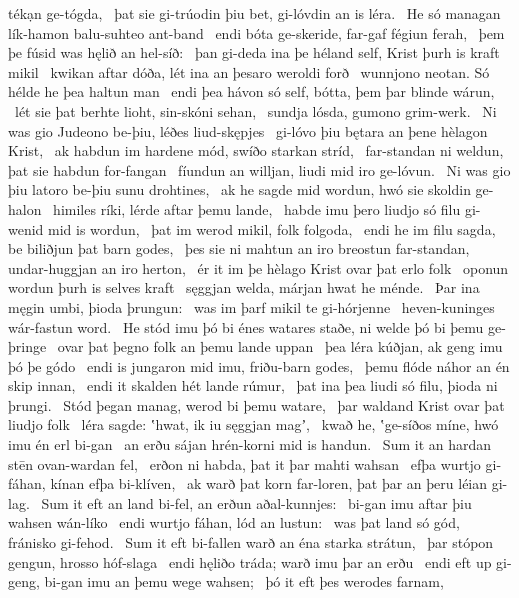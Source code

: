 tékạn ge-tógda, \hld\ þat sie gi-trúodin þiu bet,
gi-lóvdin an is léra. \hld\ He só managan lík-hamon
balu-suhteo ant-band \hld\ endi bóta ge-skeride,
far-gaf fégiun ferah, \hld\ þem þe fúsid was
hęlið an hel-síð: \hld\ þan gi-deda ina þe héland self,
Krist þurh is kraft mikil \hld\ kwikan aftar dóða,
lét ina an þesaro weroldi forð \hld\ wunnjono neotan.
Só hélde he þea haltun man \hld\ endi þea hávon só self,
bótta, þem þar blinde wárun, \hld\ lét sie þat berhte lioht,
sin-skóni sehan, \hld\ sundja lósda,
gumono grim-werk. \hld\ Ni was gio Judeono be-þiu,
léðes liud-skępjes \hld\ gi-lóvo þiu bętara
an þene hèlagon Krist, \hld\ ak habdun im hardene mód,
swíðo starkan stríd, \hld\ far-standan ni weldun,
þat sie habdun for-fangan \hld\ fíundun an willjan,
liudi mid iro ge-lóvun. \hld\ Ni was gio þiu latoro be-þiu
sunu drohtines, \hld\ ak he sagde mid wordun,
hwó sie skoldin ge-halon \hld\ himiles ríki,
lérde aftar þemu lande, \hld\ habde imu þero liudjo só filu
gi-wenid mid is wordun, \hld\ þat im werod mikil,
folk folgoda, \hld\ endi he im filu sagda,
be biliðjun þat barn godes, \hld\ þes sie ni mahtun an iro breostun far-standan,
undar-huggjan an iro herton, \hld\ ér it im þe hèlago Krist
ovar þat erlo folk \hld\ oponun wordun
þurh is selves kraft \hld\ sęggjan welda,
márjan hwat he ménde. \hld\ Þar ina męgin umbi,
þioda þrungun: \hld\ was im þarf mikil
te gi-hórjenne \hld\ heven-kuninges
wár-fastun word. \hld\ He stód imu þó bi énes watares staðe,
ni welde þó bi þemu ge-þringe \hld\ ovar þat þegno folk
an þemu lande uppan \hld\ þea léra kúðjan,
ak geng imu þó þe gódo \hld\ endi is jungaron mid imu,
friðu-barn godes, \hld\ þemu flóde náhor
an én skip innan, \hld\ endi it skalden hét
lande rúmur, \hld\ þat ina þea liudi só filu,
þioda ni þrungi. \hld\ Stód þegan manag,
werod bi þemu watare, \hld\ þar waldand Krist
ovar þat liudjo folk \hld\ léra sagde:
ʽhwat, ik iu sęggjan magʼ, \hld\ kwað he, ʽge-síðos míne,
hwó imu én erl bi-gan \hld\ an erðu sájan
hrén-korni mid is handun. \hld\ Sum it an hardan stēn
ovan-wardan fel, \hld\ erðon ni habda,
þat it þar mahti wahsan \hld\ efþa wurtjo gi-fáhan,
kínan efþa bi-klíven, \hld\ ak warð þat korn far-loren,
þat þar an þeru léian gi-lag. \hld\ Sum it eft an land bi-fel,
an erðun aðal-kunnjes: \hld\ bi-gan imu aftar þiu
wahsen wán-líko \hld\ endi wurtjo fáhan,
lód an lustun: \hld\ was þat land só gód,
fránisko gi-fehod. \hld\ Sum it eft bi-fallen warð
an éna starka strátun, \hld\ þar stópon gengun,
hrosso hóf-slaga \hld\ endi hęliðo tráda;
warð imu þar an erðu \hld\ endi eft up gi-geng,
bi-gan imu an þemu wege wahsen; \hld\ þó it eft þes werodes farnam,
